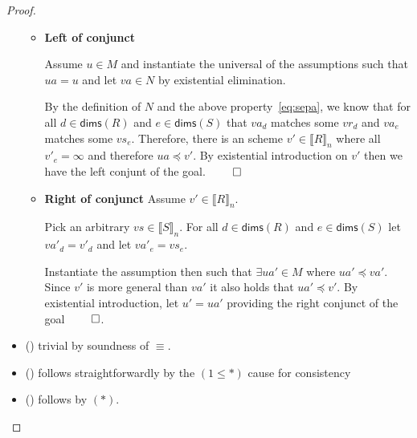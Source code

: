\documentclass[10pt]{sigplanconf}
\theoremstyle{definition}
\newcommand{\interp}[1]{\llbracket{#1}\rrbracket}
\newcommand{\trule}[1]{{\footnotesize{(\text{#1})}}}
\begin{document}
\begin{proof}
\begin{itemize}
\begin{itemize}
\item \textbf{Left of conjunct}

Assume $u \in M$ and instantiate the universal of the assumptions such
that $ua = u$ and let $va \in N$ by existential elimination.

By the definition of $N$ and the
above property~\eqref{eq:sepa}, we know that for all $d \in \mathsf{dims}(R)$
and $e \in \mathsf{dims}(S)$ that $va_d$ matches some $vr_d$
and $va_e$ matches some $vs_e$. Therefore, there is an scheme
$v' \in \interp{R}_n$ where all $v'_e = \infty$ and therefore
$ua \preceq v'$. By existential introduction on $v'$ then we have
the left conjunt of the goal. $\qed$

\item \textbf{Right of conjunct}
Assume $v' \in \interp{R}_n$. 

Pick an arbitrary $vs \in \interp{S}_n$. 
For all $d \in \mathsf{dims}(R)$
and $e \in \mathsf{dims}(S)$
let $va'_d = v'_d$ and let $va'_e = vs_e$.

Instantiate the assumption then such that $\exists ua' \in M$
where $ua' \preceq va'$.  Since $v'$ is more general than $va'$
it also holds that $ua' \preceq v'$. By existential introduction,
let $u' = ua'$ providing the right conjunct of the goal $\qed$.
\end{itemize}

\item \trule{\textsc{Eq}} trivial by soundness of $\equiv$.
\item \trule{\textsc{Cong\texttt{R}}} follows straightforwardly by the $(1 \leq *)$ 
cause for consistency
\item \trule{\textsc{rep}} follows by $(*)$.

\end{itemize}
\end{proof}
\end{document}
